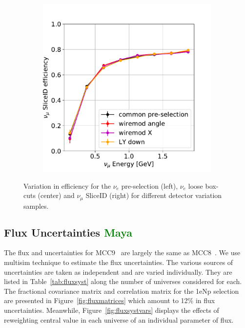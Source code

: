\documentclass[a4paper]{article}
\begin{document}
\begin{figure}[H]
\begin{center}
\begin{subfigure}[b]{0.3\textwidth}
    \end{subfigure}
    \begin{subfigure}[b]{0.3\textwidth}
    \centering
    \includegraphics[width=1.00\textwidth]{detsys/nu_e01162020_numu_slice_eff.pdf}
    \end{subfigure}
\caption{\label{fig:detsys:dedx:eLEElow}Variation in efficiency for the $\nu_e$ pre-selection (left), $\nu_e$ loose box-cuts (center) and $\nu_{\mu}$ SliceID (right) for different detector variation samples.}
\end{center}
\end{figure}

\subsection{Flux Uncertainties \textcolor{green}{Maya}}
The flux and uncertainties for MCC9~\cite{bib:fluxmcc9} are largely the same as MCC8~\cite{bib:fluxtechnote}. We use multisim technique to estimate the flux uncertainties. The various sources of uncertainties are taken as independent and are varied individually. They are listed in Table~\ref{tab:fluxsyst} along the number of universes considered for each. The fractional covariance matrix and correlation matrix for the 1eNp selection are presented in Figure~\ref{fig:fluxmatrices} which amount to 12\% in flux uncertainties. Meanwhile, Figure~\ref{fig:fluxsystvars} displays the effects of reweighting central value in each universe of an individual parameter of flux.
\end{document}
